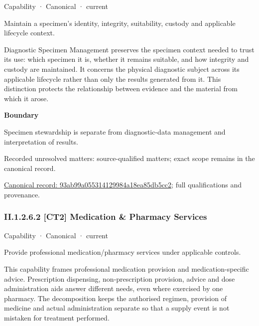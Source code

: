 \label{element:93ab99a055314129984a18ea85db5cc2}
{\small Capability · Canonical · current}\par

Maintain a specimen’s identity, integrity, suitability, custody and applicable lifecycle context.



Diagnostic Specimen Management preserves the specimen context needed to trust its use: which specimen it is, whether it remains suitable, and how integrity and custody are maintained. It concerns the physical diagnostic subject across its applicable lifecycle rather than only the results generated from it. This distinction protects the relationship between evidence and the material from which it arose.



\textbf{Boundary}



Specimen stewardship is separate from diagnostic-data management and interpretation of results.


{\small Recorded unresolved matters: source-qualified matters; exact scope remains in the canonical record.}\par
{\footnotesize \href{../../../../../../../continuum/strategy/capability/93ab99a055314129984a18ea85db5cc2.md}{Canonical record: 93ab99a055314129984a18ea85db5cc2}; full qualifications and provenance.}\par
\subsubsection*{II.1.2.6.2 [CT2] Medication \& Pharmacy Services}
\label{navigation:II.1.2.6.2}

\label{element:ab2a4e6a7acc4868bc4e7b6c0d292cb4}
{\small Capability · Canonical · current}\par

Provide professional medication/pharmacy services under applicable controls.



This capability frames professional medication provision and medication-specific advice. Prescription dispensing, non-prescription provision, advice and dose administration aids answer different needs, even where exercised by one pharmacy. The decomposition keeps the authorised regimen, provision of medicine and actual administration separate so that a supply event is not mistaken for treatment performed.



